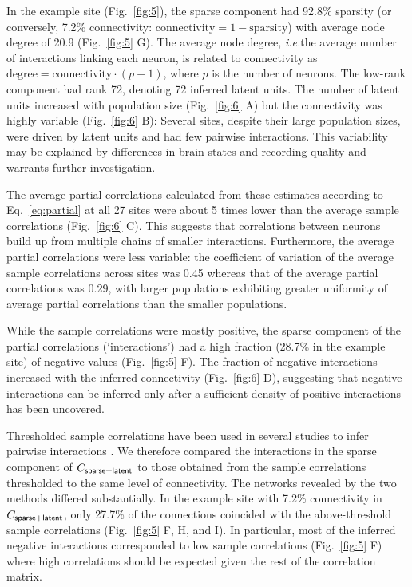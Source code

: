 In the example site (Fig.~\ref{fig:5}), the sparse component had 92.8\% sparsity (or conversely, 7.2\% connectivity: $\mbox{connectivity}=1-\mbox{sparsity}$) with average node degree of 20.9 (Fig.~\ref{fig:5} G). The average node degree, \emph{i.e.}\;the average number of interactions linking each neuron, is related to connectivity as $\mbox{degree} = \mbox{connectivity}\cdot(p-1)$, where $p$ is the number of neurons. The low-rank component had rank 72, denoting 72 inferred latent units. The number of latent units increased with population size (Fig.~\ref{fig:6} A) but the connectivity was highly variable (Fig.~\ref{fig:6} B): Several sites, despite their large population sizes, were driven by latent units and had few pairwise interactions. This variability may be explained by differences in brain states and recording quality and warrants further investigation.

The average partial correlations calculated from these estimates according to Eq.~\ref{eq:partial} at all 27 sites were about 5 times lower than the average sample correlations (Fig.~\ref{fig:6} C). This suggests that correlations between neurons build up from multiple chains of smaller interactions. Furthermore, the average partial correlations were less variable: the coefficient of variation of the average sample correlations across sites was 0.45 whereas that of the average partial correlations was 0.29, with larger populations exhibiting greater uniformity of average partial correlations than the smaller populations.

While the sample correlations were mostly positive, the sparse component of the partial correlations (`interactions') had a high fraction (28.7\% in the example site) of negative values (Fig.~\ref{fig:5} F). The fraction of negative interactions increased with the inferred connectivity (Fig.~\ref{fig:6} D), suggesting that negative interactions can be inferred only after a sufficient density of positive interactions has been uncovered.

Thresholded sample correlations have been used in several studies to infer pairwise interactions \cite{Golshani:2009, Feldt:2011, Malmersjo:2013, Sadovsky:2014}.  We therefore compared the interactions in the sparse component of $C_{\sf sparse+latent}$ to those obtained from the sample correlations thresholded to the same level of connectivity. The networks revealed by the two methods differed substantially. In the example site with 7.2\% connectivity in $C_{\sf sparse+latent}$, only 27.7\% of the connections coincided with the above-threshold sample correlations (Fig.~\ref{fig:5} F, H, and I). In particular, most of the inferred negative interactions corresponded to low sample correlations (Fig.~\ref{fig:5} F) where high correlations should be expected given the rest of the correlation matrix.

